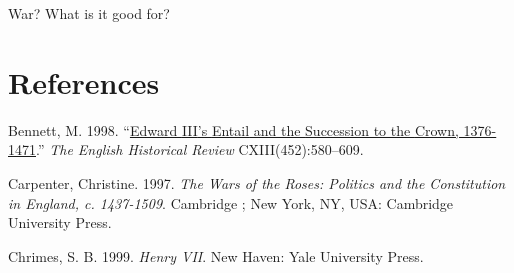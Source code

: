 \documentclass[11pt,article,oneside]{memoir}
\newlength{\cslhangindent}
\newlength{\cslentryspacingunit} %
\newenvironment{CSLReferences}[2] %
 {%
  \setlength{\parindent}{0pt}
  \ifodd #1
  \let\oldpar\par
  \def\par{\hangindent=\cslhangindent\oldpar}
  \fi
  \setlength{\parskip}{#2\cslentryspacingunit}
 }%
 {}
\begin{document}
War? What is it good for?

\hypertarget{references}{%
\section{References}\label{references}}

\setlength{\parindent}{-0.2in}
\setlength{\leftskip}{0.2in}
\setlength{\parskip}{8pt}
\vspace*{-0.2in}

\noindent

\hypertarget{refs}{}
\begin{CSLReferences}{1}{0}
\leavevmode{}%
Bennett, M. 1998.
{``\href{https://doi.org/10.1093/ehr/CXIII.452.580}{Edward {III}'s
{Entail} and the {Succession} to the {Crown}, 1376-1471}.''} \emph{The
English Historical Review} CXIII(452):580--609.

\leavevmode{}%
Carpenter, Christine. 1997. \emph{The {Wars} of the {Roses}: Politics
and the Constitution in {England}, c. 1437-1509}. {Cambridge ; New York,
NY, USA}: {Cambridge University Press}.

\leavevmode{}%
Chrimes, S. B. 1999. \emph{Henry {VII}}. {New Haven}: {Yale University
Press}.

\end{CSLReferences}
\end{document}
